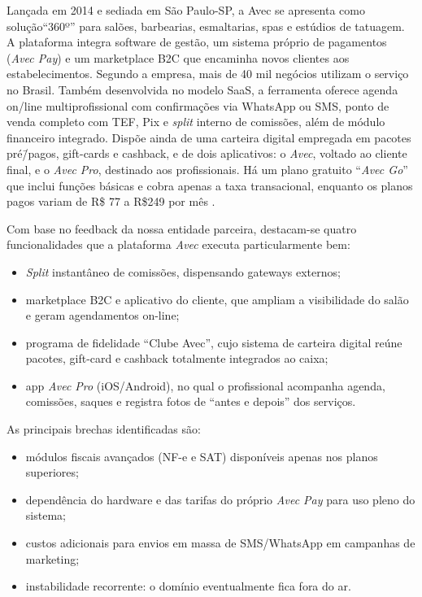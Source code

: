 Lançada em 2014 e sediada em São Paulo-SP, a Avec se apresenta como solução``360º'' para salões, barbearias, esmaltarias, spas e estúdios de tatuagem. A plataforma integra software de gestão, um sistema próprio de pagamentos (\emph{Avec Pay}) e um marketplace B2C que encaminha novos clientes aos estabelecimentos. Segundo a empresa, mais de 40 mil negócios utilizam o serviço no
Brasil. Também desenvolvida no modelo SaaS, a ferramenta oferece agenda on\-/line multiprofissional com confirmações via WhatsApp ou SMS, ponto de venda completo com TEF, Pix e \emph{split} interno de comissões, além de módulo financeiro integrado. Dispõe ainda de uma carteira digital empregada em pacotes pré\=/pagos, gift-cards
e cashback, e de dois aplicativos: o \emph{Avec}, voltado ao cliente final, e o \emph{Avec Pro}, destinado aos profissionais. Há um plano gratuito ``\emph{Avec Go}'' que inclui funções básicas e cobra apenas a taxa transacional, enquanto os planos pagos variam de R\$ 77 a
R\$249 por mês \cite{Avec}.


Com base no feedback da nossa entidade parceira, destacam-se quatro funcionalidades que
a plataforma \emph{Avec} executa particularmente bem:
\begin{itemize}
	\item \emph{Split} instantâneo de comissões, dispensando gateways externos;
	\item marketplace B2C e aplicativo do cliente, que ampliam a visibilidade do salão e geram agendamentos on-line;
	\item programa de fidelidade “Clube Avec”, cujo sistema de carteira digital reúne pacotes, gift-card e cashback totalmente integrados ao caixa;
	\item app \emph{Avec Pro} (iOS/Android), no qual o profissional acompanha agenda,
	comissões, saques e registra fotos de “antes e depois” dos serviços.
\end{itemize}

As principais brechas identificadas são:
\begin{itemize}
	\item módulos fiscais avançados (NF-e e SAT) disponíveis apenas nos planos superiores;
	\item dependência do hardware e das tarifas do próprio \emph{Avec Pay} para uso pleno do sistema;
	\item custos adicionais para envios em massa de SMS/WhatsApp em campanhas de marketing;
	\item instabilidade recorrente: o domínio eventualmente fica fora do ar.
\end{itemize}


